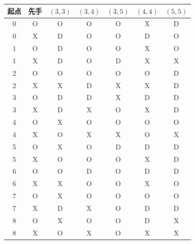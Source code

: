\begin{tabular}{ccccccc}
\toprule
起点 & 先手 & $(3,3)$ & $(3,4)$ & $(3,5)$ & $(4,4)$ & $(5,5)$ \\
\midrule
0 & O & O & O & O & X & D \\
0 & X & D & O & O & D & O \\
1 & O & D & O & O & X & O \\
1 & X & D & O & D & X & X \\
2 & O & O & O & O & O & D \\
2 & X & X & D & X & X & D \\
3 & O & D & D & X & D & D \\
3 & X & D & X & O & X & D \\
4 & O & X & O & O & O & O \\
4 & X & O & X & X & O & X \\
5 & O & X & O & D & D & D \\
5 & X & O & O & O & X & D \\
6 & O & O & D & O & D & D \\
6 & X & X & O & O & X & O \\
7 & O & X & O & O & O & O \\
7 & X & D & X & O & D & D \\
8 & O & X & O & O & D & X \\
8 & X & O & X & O & X & X \\
\bottomrule
\end{tabular}
